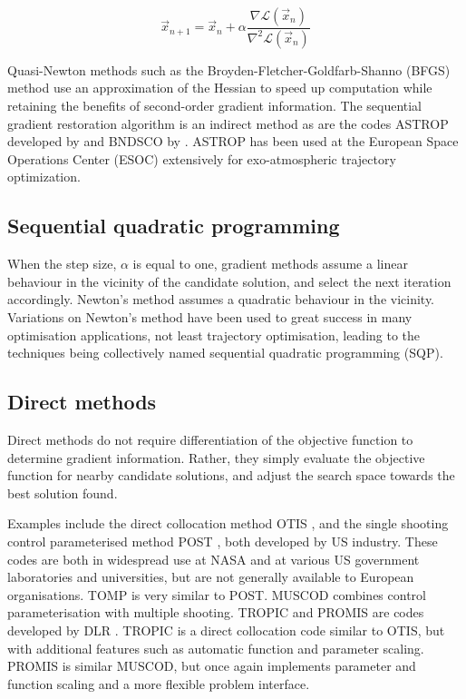 \begin{equation} \label{eq:newtons-method}
\vec{x}_{n+1}=\vec{x}_n + \alpha\frac{\nabla\mathcal{L}(\vec{x}_n)}{\nabla^2\mathcal{L}(\vec{x}_n)}
\end{equation}

Quasi-Newton methods such as the Broyden-Fletcher-Goldfarb-Shanno (BFGS) method use an approximation of the Hessian to speed up computation while retaining the benefits of second-order gradient information. The sequential gradient restoration algorithm \parencite[SGRA, ][]{Miele1975} is an indirect method as are the codes ASTROP developed by \textcite{Bartholomew-Biggs1987} and BNDSCO by \textcite{Bulirsch1971}. ASTROP has been used at the European Space Operations Center (ESOC) extensively for exo-atmospheric trajectory optimization. 

\subsection{Sequential quadratic programming} \label{sub:SQP}

When the step size, $\alpha$ is equal to one, gradient methods assume a linear behaviour in the vicinity of the candidate solution, and select the next iteration accordingly. Newton's method assumes a quadratic behaviour in the vicinity. Variations on Newton's method have been used to great success in many optimisation applications, not least trajectory optimisation, leading to the techniques being collectively named sequential quadratic programming (SQP). 

\subsection{Direct methods}

Direct methods do not require differentiation of the objective function to determine gradient information. Rather, they simply evaluate the objective function for nearby candidate solutions, and adjust the search space towards the best solution found.

Examples include the direct collocation method OTIS \parencite{Hargraves1987}, and the single shooting control parameterised method POST \parencite{Brauer1977}, both developed by US industry. These codes are both in widespread use at NASA and at various US government laboratories and universities, but are not generally available to European organisations. TOMP \parencite{Kraft1980} is very similar to POST. MUSCOD \parencite{Bock1984} combines control parameterisation with multiple shooting. TROPIC and PROMIS are codes developed by DLR \parencite{Jansch1990}. TROPIC is a direct collocation code similar to OTIS, but with additional features such as automatic function and parameter scaling. PROMIS is similar MUSCOD, but once again implements parameter and function scaling and a more flexible problem interface.

